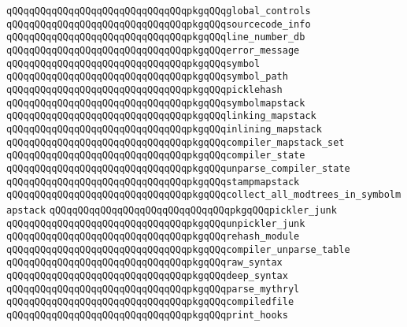\verb|qQQqqQQqqQQqqQQqqQQqqQQqqQQqqQQqpkgqQQqglobal_controls|\newline
\verb|qQQqqQQqqQQqqQQqqQQqqQQqqQQqqQQqpkgqQQqsourcecode_info|\newline
\verb|qQQqqQQqqQQqqQQqqQQqqQQqqQQqqQQqpkgqQQqline_number_db|\newline
\verb|qQQqqQQqqQQqqQQqqQQqqQQqqQQqqQQqpkgqQQqerror_message|\newline
\verb|qQQqqQQqqQQqqQQqqQQqqQQqqQQqqQQqpkgqQQqsymbol|\newline
\verb|qQQqqQQqqQQqqQQqqQQqqQQqqQQqqQQqpkgqQQqsymbol_path|\newline
\verb|qQQqqQQqqQQqqQQqqQQqqQQqqQQqqQQqpkgqQQqpicklehash|\newline
\verb|qQQqqQQqqQQqqQQqqQQqqQQqqQQqqQQqpkgqQQqsymbolmapstack|\newline
\verb|qQQqqQQqqQQqqQQqqQQqqQQqqQQqqQQqpkgqQQqlinking_mapstack|\newline
\verb|qQQqqQQqqQQqqQQqqQQqqQQqqQQqqQQqpkgqQQqinlining_mapstack|\newline
\verb|qQQqqQQqqQQqqQQqqQQqqQQqqQQqqQQqpkgqQQqcompiler_mapstack_set|\newline
\verb|qQQqqQQqqQQqqQQqqQQqqQQqqQQqqQQqpkgqQQqcompiler_state|\newline
\verb|qQQqqQQqqQQqqQQqqQQqqQQqqQQqqQQqpkgqQQqunparse_compiler_state|\newline
\verb|qQQqqQQqqQQqqQQqqQQqqQQqqQQqqQQqpkgqQQqstampmapstack|\newline
\verb|qQQqqQQqqQQqqQQqqQQqqQQqqQQqqQQqpkgqQQqcollect_all_modtrees_in_symbolmapstack|\newline
\verb|qQQqqQQqqQQqqQQqqQQqqQQqqQQqqQQqpkgqQQqpickler_junk|\newline
\verb|qQQqqQQqqQQqqQQqqQQqqQQqqQQqqQQqpkgqQQqunpickler_junk|\newline
\verb|qQQqqQQqqQQqqQQqqQQqqQQqqQQqqQQqpkgqQQqrehash_module|\newline
\verb|qQQqqQQqqQQqqQQqqQQqqQQqqQQqqQQqpkgqQQqcompiler_unparse_table|\newline
\verb|qQQqqQQqqQQqqQQqqQQqqQQqqQQqqQQqpkgqQQqraw_syntax|\newline
\verb|qQQqqQQqqQQqqQQqqQQqqQQqqQQqqQQqpkgqQQqdeep_syntax|\newline
\verb|qQQqqQQqqQQqqQQqqQQqqQQqqQQqqQQqpkgqQQqparse_mythryl|\newline
\verb|qQQqqQQqqQQqqQQqqQQqqQQqqQQqqQQqpkgqQQqcompiledfile|\newline
\verb|qQQqqQQqqQQqqQQqqQQqqQQqqQQqqQQqpkgqQQqprint_hooks|\newline
